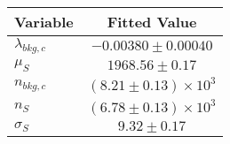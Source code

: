 \begin{tabular}[t]{lc}
\hline
Variable &Fitted Value\\
\hline\hline
$\lambda_{bkg,c}$&$-0.00380\pm0.00040$\\
\hline
$\mu_{S}$&$1968.56\pm0.17$\\
\hline
$n_{bkg,c}$&$(8.21\pm0.13)\times 10^3$\\
\hline
$n_{S}$&$(6.78\pm0.13)\times 10^3$\\
\hline
$\sigma_{S}$&$9.32\pm0.17$\\
\hline
\end{tabular}